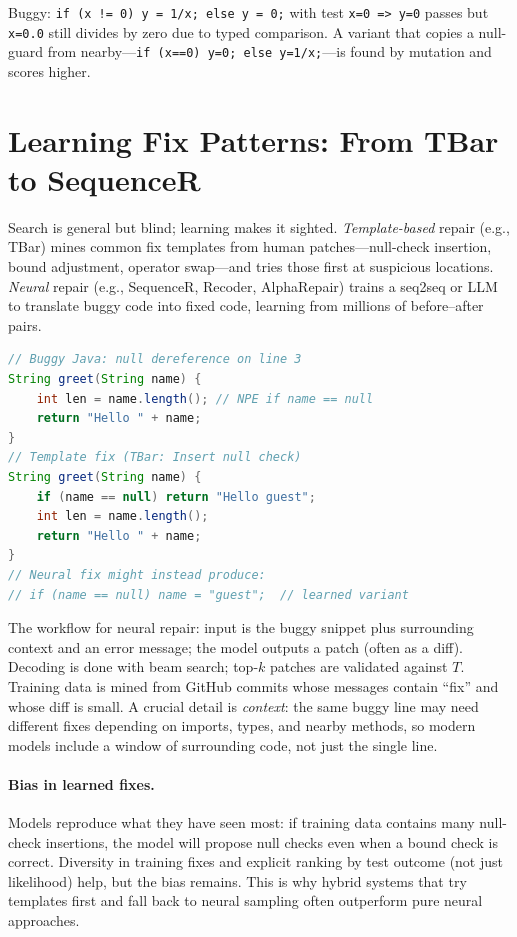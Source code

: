 \begin{example}
Buggy: \texttt{if (x != 0) y = 1/x; else y = 0;} with test \texttt{x=0 => y=0} passes but \texttt{x=0.0} still divides by zero due to typed comparison. A variant that copies a null-guard from nearby---\texttt{if (x==0) y=0; else y=1/x;}---is found by mutation and scores higher.
\end{example}

\section{Learning Fix Patterns: From TBar to SequenceR}
\label{sec:learned-repair}
Search is general but blind; learning makes it sighted. \emph{Template-based} repair (e.g., TBar) mines common fix templates from human patches---null-check insertion, bound adjustment, operator swap---and tries those first at suspicious locations. \emph{Neural} repair (e.g., SequenceR, Recoder, AlphaRepair) trains a seq2seq or LLM to translate buggy code into fixed code, learning from millions of before--after pairs.

\begin{lstlisting}[language=Java, caption={Template vs.\ learned fix: the same null dereference repaired two ways.}, label={lst:template-fix}]
// Buggy Java: null dereference on line 3
String greet(String name) {
    int len = name.length(); // NPE if name == null
    return "Hello " + name;
}
// Template fix (TBar: Insert null check)
String greet(String name) {
    if (name == null) return "Hello guest";
    int len = name.length();
    return "Hello " + name;
}
// Neural fix might instead produce:
// if (name == null) name = "guest";  // learned variant
\end{lstlisting}

The workflow for neural repair: input is the buggy snippet plus surrounding context and an error message; the model outputs a patch (often as a diff). Decoding is done with beam search; top-$k$ patches are validated against $T$. Training data is mined from GitHub commits whose messages contain ``fix'' and whose diff is small. A crucial detail is \emph{context}: the same buggy line may need different fixes depending on imports, types, and nearby methods, so modern models include a window of surrounding code, not just the single line.

\paragraph{Bias in learned fixes.} Models reproduce what they have seen most: if training data contains many null-check insertions, the model will propose null checks even when a bound check is correct. Diversity in training fixes and explicit ranking by test outcome (not just likelihood) help, but the bias remains. This is why hybrid systems that try templates first and fall back to neural sampling often outperform pure neural approaches.

